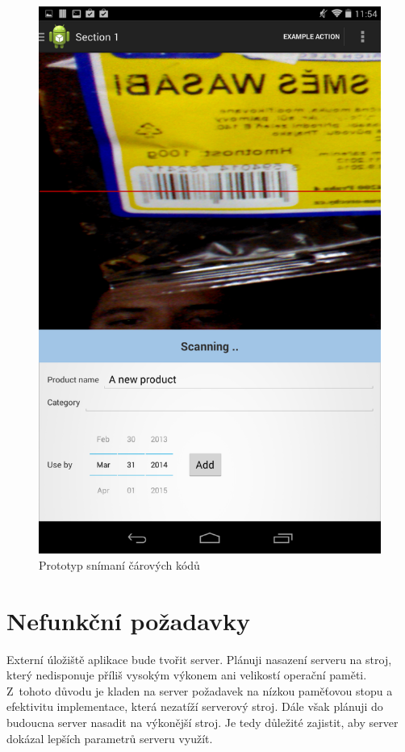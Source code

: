 \documentclass[thesis=B,czech]{FITthesis}[2013/10/20]
\begin{document}
\begin{figure}[H]
  \centering
  \includegraphics[scale=0.3]{screenshots/scan_prototype.png}
  \caption{Prototyp snímaní čárových kódů}
  \label{fig:ScanPrototype}
\end{figure}

\section{Nefunkční požadavky}

Externí úložiště aplikace bude tvořit server. Plánuji nasazení serveru na stroj, který nedisponuje příliš vysokým výkonem ani velikostí operační paměti. Z~tohoto důvodu je kladen na server požadavek na nízkou paměťovou stopu a efektivitu implementace, která nezatíží serverový stroj. Dále však plánuji do budoucna server nasadit na výkonější stroj. Je tedy důležité zajistit, aby server dokázal lepších parametrů serveru využít.
\end{document}
